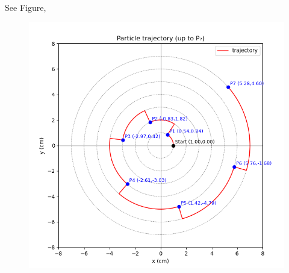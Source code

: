 \documentclass[journal]{IEEEtran}
\begin{document}
See Figure,
\begin{figure}[h!]
    \centering
    \includegraphics[height=0.5\textheight, keepaspectratio]{figs/fig.png}
    \label{figure_1}
\end{figure}
\end{document}
